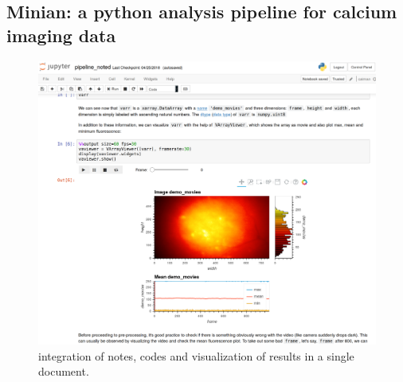 \documentclass[master.tex]{subfiles}
\begin{document}
\subsection*{Minian: a python analysis pipeline for calcium imaging data}


\begin{figure}[!hbt]
  \centering \includegraphics[scale = .135]{Figures/prelim_minian.png}
  \caption{\footnotesize integration of notes, codes and visualization of
    results in a single document.}
  \label{fig:prelim_minian}
\end{figure}
\end{document}
